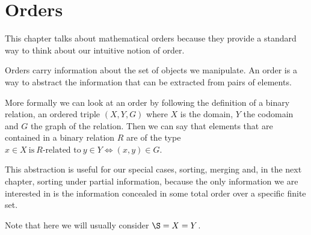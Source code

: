 \section{Orders}

This chapter talks about mathematical orders because they provide a standard
way to think about our intuitive notion of order.

Orders carry information about the set of objects we manipulate. An order is a
way to abstract the information that can be extracted from pairs of elements.

More formally we can look at an order by following the definition of a binary
relation, an ordered triple $(X, Y, G)$ where $X$ is the domain, $Y$ the
codomain and $G$ the graph of the relation.
Then we can say that elements that are contained in a binary relation $R$ are
of the type $x \in X~\text{is}~R\text{-related to}~y \in Y \iff (x, y) \in G$.

This abstraction is useful for our special cases, \ie sorting, merging and, in the
next chapter, sorting under partial information, because the only information
we are interested in is the information concealed in some total order over a
specific finite set.

Note that here we will usually consider \(\S = X = Y\).
